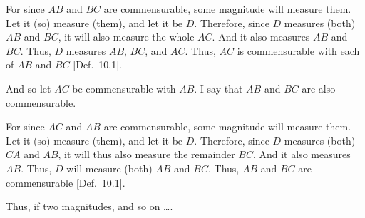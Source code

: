 \begin{Parallel}{}{}
{\epsfysize=0.6in
\centerline{}

For since $AB$ and $BC$ are commensurable, some  magnitude will
measure them. Let it (so) measure (them), and let it be $D$. Therefore,
since $D$ measures (both) $AB$ and $BC$, it will also measure the
whole $AC$. And it also measures $AB$ and $BC$. Thus, $D$
measures  $AB$, $BC$, and $AC$. Thus, $AC$ is commensurable
with each of $AB$ and $BC$ [Def.~10.1].

And so let $AC$ be commensurable with $AB$. I say that $AB$ and
$BC$ are also commensurable.

For since $AC$ and $AB$ are commensurable, some  magnitude
will measure them. Let it (so) measure (them), and let it be $D$. Therefore,
since $D$ measures (both) $CA$ and $AB$, it will thus also
measure the remainder $BC$. And it also measures $AB$. Thus, $D$ will
measure (both) $AB$ and $BC$. Thus, $AB$ and $BC$ are commensurable [Def.~10.1].

Thus, if two magnitudes, and so on \ldots.}
\end{Parallel}

